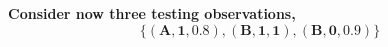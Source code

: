 \documentclass[12pt]{article}
\begin{document}
\begin{enumerate}[leftmargin=\labelsep]

    \vspace{20pt}
    \textbf{Consider now three testing observations,} 
    \begin{equation*}
        {\boldsymbol{\{(A, 1, 0.8), (B, 1, 1), (B, 0, 0.9)\}}}
    \end{equation*}


\end{enumerate}
\end{document}

